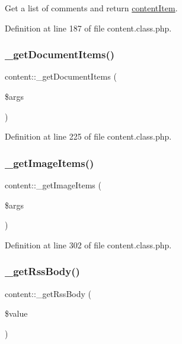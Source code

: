 Get a list of comments and return \hyperlink{classcontentItem}{content\+Item}. 



Definition at line 187 of file content.\+class.\+php.

\hypertarget{classcontent_ac3e0ed7e0c14712bd93e68cae1603e2f}{}\label{classcontent_ac3e0ed7e0c14712bd93e68cae1603e2f} 
\subsubsection{\texorpdfstring{\+\_\+get\+Document\+Items()}{\_getDocumentItems()}}
{\footnotesize\ttfamily content\+::\+\_\+get\+Document\+Items (\begin{DoxyParamCaption}\item[{}]{\$args }\end{DoxyParamCaption})}



Definition at line 225 of file content.\+class.\+php.

\hypertarget{classcontent_abdff6ddbe036e410913b5da1b9a5ce1b}{}\label{classcontent_abdff6ddbe036e410913b5da1b9a5ce1b} 
\subsubsection{\texorpdfstring{\+\_\+get\+Image\+Items()}{\_getImageItems()}}
{\footnotesize\ttfamily content\+::\+\_\+get\+Image\+Items (\begin{DoxyParamCaption}\item[{}]{\$args }\end{DoxyParamCaption})}



Definition at line 302 of file content.\+class.\+php.

\hypertarget{classcontent_a75dcd12f149001ea88ceb13a286ce040}{}\label{classcontent_a75dcd12f149001ea88ceb13a286ce040} 
\subsubsection{\texorpdfstring{\+\_\+get\+Rss\+Body()}{\_getRssBody()}}
{\footnotesize\ttfamily content\+::\+\_\+get\+Rss\+Body (\begin{DoxyParamCaption}\item[{}]{\$value }\end{DoxyParamCaption})}



